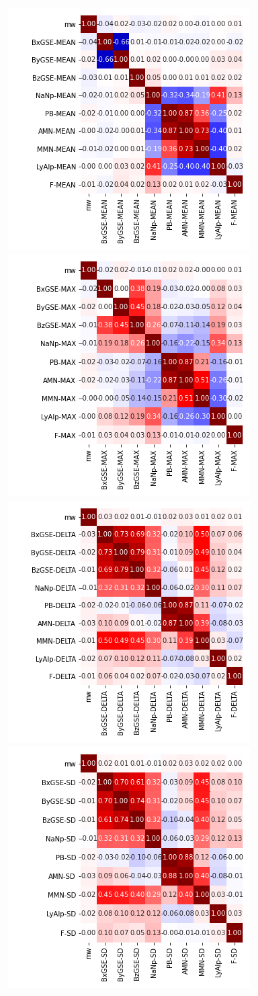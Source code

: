 \documentclass[12pt]{article}
\begin{document}
\newpage

\begin{figure}
   \includegraphics[width=0.57\textwidth]{six-seven_mean_2.png}
   \includegraphics[width=0.57\textwidth]{six-seven_max_2.png}
   \includegraphics[width=0.57\textwidth]{six-seven_delta_2.png}
   \includegraphics[width=0.57\textwidth]{six-seven_sd_2.png}
\end{figure}
\end{document}
